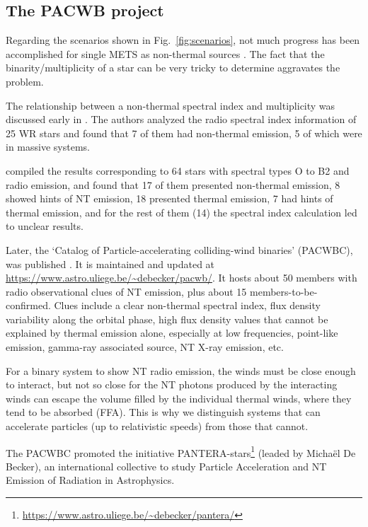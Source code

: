 \documentclass[baaa]{baaa}
\begin{document}
\subsection{The PACWB project}

Regarding the scenarios shown in Fig.~\ref{fig:scenarios}, not much progress has been accomplished for single METS as non-thermal sources \citep{vanloo2006,anindya2023}. The fact that the binarity/multiplicity of a star can be very tricky to determine aggravates the problem. 

The relationship between a non-thermal spectral index and multiplicity was discussed early in \citet{dougherty2000}. The authors analyzed the radio spectral index information of 25 WR stars and found that 7 of them had non-thermal emission, 5 of which were in massive systems.

\citet{jaenproc2010} compiled the results corresponding to 64 stars with spectral types O to B2 and radio emission, and found that 17 of them presented non-thermal emission, 8 showed hints of NT emission, 18 presented thermal emission, 7 had hints of thermal emission, and for the rest of them (14) the spectral index calculation led to unclear results.

Later, the `Catalog of Particle-accelerating colliding-wind binaries' (PACWBC),  was published \citep{pacwb2013}. It is maintained and updated  at \url{https://www.astro.uliege.be/~debecker/pacwb/}. It hosts about 50 members with radio observational clues of NT emission, plus about 15 members-to-be-confirmed. Clues include a clear non-thermal spectral index, flux density variability along the orbital phase, high  flux density values that cannot be explained by thermal emission alone, especially at low frequencies, point-like emission, gamma-ray associated source, NT X-ray emission, etc. 

For a binary system to show NT radio emission, the winds must be close enough to interact, but not so close for the NT photons produced by the interacting winds can escape the volume filled by the individual thermal winds, where they tend to be absorbed (FFA). This is why we distinguish systems that can accelerate particles (up to relativistic speeds) from those that cannot. 

The PACWBC promoted the initiative PANTERA-stars\footnote{\url{https://www.astro.uliege.be/~debecker/pantera/}} {(leaded by Micha\"el De Becker)}, an international collective to study Particle Acceleration and NT Emission of Radiation in Astrophysics.
\end{document}
